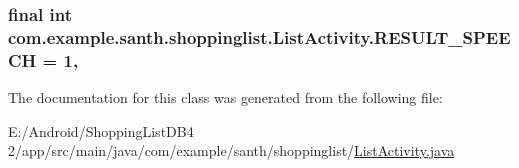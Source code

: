 \subsubsection[{\texorpdfstring{R\+E\+S\+U\+L\+T\+\_\+\+S\+P\+E\+E\+CH}{RESULT_SPEECH}}]{\setlength{\rightskip}{0pt plus 5cm}final int com.\+example.\+santh.\+shoppinglist.\+List\+Activity.\+R\+E\+S\+U\+L\+T\+\_\+\+S\+P\+E\+E\+CH = 1\hspace{0.3cm}{\ttfamily [static]}, {\ttfamily [protected]}}\hypertarget{classcom_1_1example_1_1santh_1_1shoppinglist_1_1_list_activity_ae837f52436477b84e95460db4cc00cec}{}\label{classcom_1_1example_1_1santh_1_1shoppinglist_1_1_list_activity_ae837f52436477b84e95460db4cc00cec}


The documentation for this class was generated from the following file\+:\begin{DoxyCompactItemize}
\item 
E\+:/\+Android/\+Shopping\+List\+D\+B4 2/app/src/main/java/com/example/santh/shoppinglist/\hyperlink{_list_activity_8java}{List\+Activity.\+java}\end{DoxyCompactItemize}
